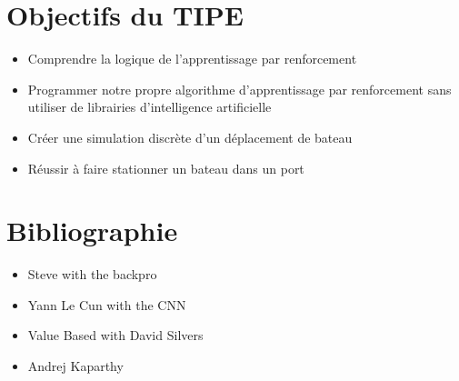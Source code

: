 \documentclass[12pt,a4paper]{extarticle}
\begin{document}
\section*{Objectifs du TIPE}

\begin{itemize}

\item Comprendre la logique de l'apprentissage par renforcement
\item Programmer notre propre algorithme d'apprentissage par renforcement sans utiliser de librairies d'intelligence artificielle
\item Créer une simulation discrète d'un déplacement de bateau
\item Réussir à faire stationner un bateau dans un port

\end{itemize}

\section*{Bibliographie}
\begin{itemize}

\item Steve with the backpro
\item Yann Le Cun with the CNN
\item Value Based with David Silvers
\item Andrej Kaparthy

\end{itemize}
\end{document}
